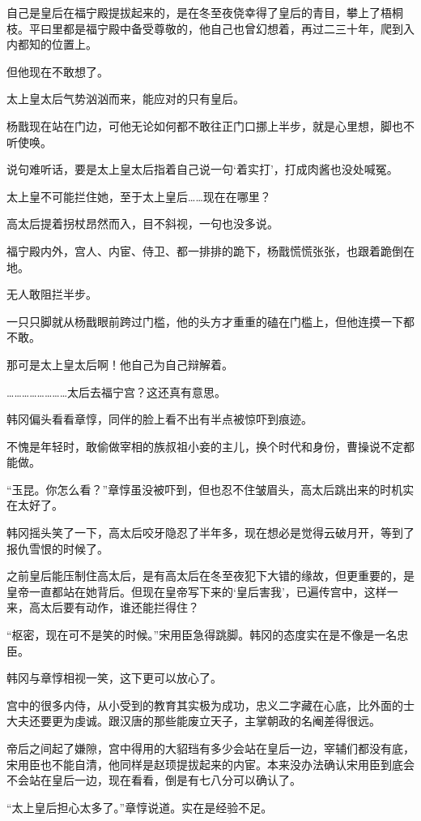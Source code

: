 自己是皇后在福宁殿提拔起来的，是在冬至夜侥幸得了皇后的青目，攀上了梧桐枝。平曰里都是福宁殿中备受尊敬的，他自己也曾幻想着，再过二三十年，爬到入内都知的位置上。

但他现在不敢想了。

太上皇太后气势汹汹而来，能应对的只有皇后。

杨戬现在站在门边，可他无论如何都不敢往正门口挪上半步，就是心里想，脚也不听使唤。

说句难听话，要是太上皇太后指着自己说一句‘着实打’，打成肉酱也没处喊冤。

太上皇不可能拦住她，至于太上皇后……现在在哪里？

高太后提着拐杖昂然而入，目不斜视，一句也没多说。

福宁殿内外，宫人、内宦、侍卫、都一排排的跪下，杨戬慌慌张张，也跟着跪倒在地。

无人敢阻拦半步。

一只只脚就从杨戬眼前跨过门槛，他的头方才重重的磕在门槛上，但他连摸一下都不敢。

那可是太上皇太后啊！他自己为自己辩解着。

……………………太后去福宁宫？这还真有意思。

韩冈偏头看看章惇，同伴的脸上看不出有半点被惊吓到痕迹。

不愧是年轻时，敢偷做宰相的族叔祖小妾的主儿，换个时代和身份，曹操说不定都能做。

“玉昆。你怎么看？”章惇虽没被吓到，但也忍不住皱眉头，高太后跳出来的时机实在太好了。

韩冈摇头笑了一下，高太后咬牙隐忍了半年多，现在想必是觉得云破月开，等到了报仇雪恨的时候了。

之前皇后能压制住高太后，是有高太后在冬至夜犯下大错的缘故，但更重要的，是皇帝一直都站在她背后。但现在皇帝写下来的‘皇后害我’，已遍传宫中，这样一来，高太后要有动作，谁还能拦得住？

“枢密，现在可不是笑的时候。”宋用臣急得跳脚。韩冈的态度实在是不像是一名忠臣。

韩冈与章惇相视一笑，这下更可以放心了。

宫中的很多内侍，从小受到的教育其实极为成功，忠义二字藏在心底，比外面的士大夫还要更为虔诚。跟汉唐的那些能废立天子，主掌朝政的名阉差得很远。

帝后之间起了嫌隙，宫中得用的大貂珰有多少会站在皇后一边，宰辅们都没有底，宋用臣也不能自清，他同样是赵顼提拔起来的内宦。本来没办法确认宋用臣到底会不会站在皇后一边，现在看看，倒是有七八分可以确认了。

“太上皇后担心太多了。”章惇说道。实在是经验不足。

